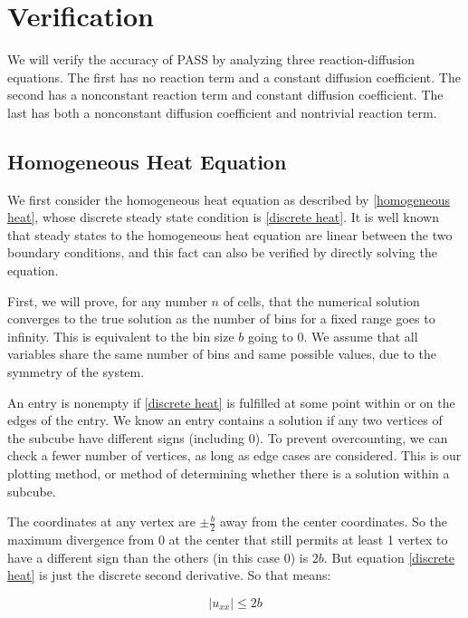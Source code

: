\documentclass[11pt]{article}
\begin{document}
\section{Verification}\label{sec:verification}

We will verify the accuracy of PASS by analyzing three reaction-diffusion equations. The first has no reaction term and a constant diffusion coefficient. The second has a nonconstant reaction term and constant diffusion coefficient. The last has both a nonconstant diffusion coefficient and nontrivial reaction term.

\subsection{Homogeneous Heat Equation}

We first consider the homogeneous heat equation as described by \cref{homogeneous heat}, whose discrete steady state condition is \cref{discrete heat}. It is well known that steady states to the homogeneous heat equation are linear between the two boundary conditions, and this fact can also be verified by directly solving the equation.

First, we will prove, for any number $n$ of cells, that the numerical solution converges to the true solution as the number of bins for a fixed range goes to infinity. This is equivalent to the bin size $b$ going to 0. We assume that all variables share the same number of bins and same possible values, due to the symmetry of the system.

An entry is nonempty if \cref{discrete heat} is fulfilled at some point within or on the edges of the entry. We know an entry contains a solution if any two vertices of the subcube have different signs (including 0). To prevent overcounting, we can check a fewer number of vertices, as long as edge cases are considered. This is our plotting method, or method of determining whether there is a solution within a subcube.

The coordinates at any vertex are $\pm \frac{b}{2}$ away from the center coordinates. So the maximum divergence from 0 at the center that still permits at least 1 vertex to have a different sign than the others (in this case 0) is $2b$. But equation \cref{discrete heat} is just the discrete second derivative. So that means:

\begin{equation}
    \label{max_diverge}
    |u_{xx}| \le 2b
\end{equation}
\end{document}
